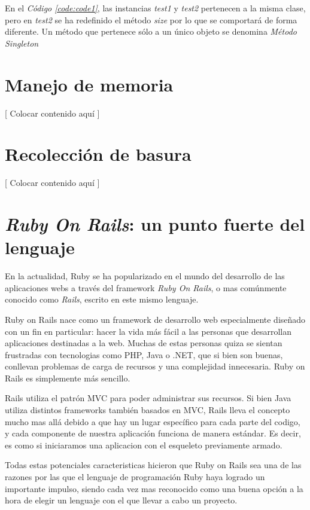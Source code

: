 \documentclass{article}
\newcommand{\refcode}[1]{\textit{Código \ref{#1}}}
\begin{document}
 
\bigskip

	En el \refcode{code:code1}, las instancias \textit{test1} y \textit{test2} pertenecen a la misma clase, pero en \textit{test2} se ha redefinido el método \textit{size} por lo que se comportará de forma diferente. Un método que pertenece sólo a un único objeto se denomina \textit{Método Singleton}


\section{Manejo de memoria}

	[ Colocar contenido aquí ]




\section{Recolección de basura}

	[ Colocar contenido aquí ]





\section{\textit{Ruby On Rails}: un punto fuerte del lenguaje}

En la actualidad, Ruby se ha popularizado en el mundo del desarrollo de las aplicaciones webs a través del framework \textit{Ruby On Rails}, o mas comúnmente conocido como \textit{Rails}, escrito en este mismo lenguaje.\par
Ruby on Rails nace como un framework de desarrollo web especialmente diseñado con un fin en particular: hacer la vida más fácil a las personas que desarrollan aplicaciones destinadas a la web. Muchas de estas personas quiza se sientan frustradas con tecnologias como PHP, Java o .NET, que si bien son buenas, conllevan problemas de carga de recursos y una complejidad innecesaria. Ruby on Rails es simplemente más sencillo.\par
 Rails utiliza el patrón MVC para poder administrar sus recursos. Si bien Java utiliza distintos frameworks también basados en MVC, Rails lleva el concepto mucho mas allá debido a que hay un lugar específico para cada parte del codigo, y cada componente de nuestra aplicación funciona de manera estándar. Es decir, es como si iniciaramos una aplicacion con el esqueleto previamente armado.\par
Todas estas potenciales caracteristicas hicieron que Ruby on Rails sea una de las razones por las que el lenguaje de programación Ruby haya logrado un importante impulso, siendo cada vez mas reconocido como una buena opción a la hora de elegir un lenguaje con el que llevar a cabo un proyecto.
\end{document}
